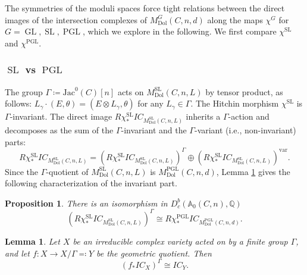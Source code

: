 \documentclass[11pt,reqno]{amsart}
\theoremstyle{plain} %
\newtheorem{prop}[theorem]{Proposition}
\newtheorem{lemma}[theorem]{Lemma}
\theoremstyle{definition}
\newcommand{\QQ}{\mathbb{Q}}
\DeclareMathOperator{\GL}{GL}
\DeclareMathOperator{\SL}{SL}
\DeclareMathOperator{\PGL}{PGL}
\newcommand{\Dol}{\mathrm{Dol}}
\newcommand{\Jac}{\mathrm{Jac}}
\newcommand{\IC}{IC}
\renewcommand{\AA}{\mathbb{A}}
\begin{document}
The symmetries of the moduli spaces force tight relations between the direct images of the intersection complexes of $M^{G}_{\Dol}(C,n,d)$ along the maps $\chi^G$ for $G = \GL, \SL, \PGL$, which we explore in the following. We first compare $\chi^{\SL}$ and $\chi^{\PGL}$.

\subsubsection{$\SL$ vs $\PGL$}  %

The group $\Gamma \coloneqq \Jac^0(C)[n]$ acts on $M^{\SL}_{\Dol}(C,n,L)$ by tensor product, as follows: $L_{\gamma} \cdot (E, \theta)=(E \otimes L_\gamma, \theta)$ for any $L_{\gamma} \in \Gamma$. The Hitchin morphism $\chi^{\SL}$ is $\Gamma$-invariant. The direct image $R\chi_*^{\SL} \IC_{M^{\SL}_{\Dol}(C,n,L)}$ inherits a $\Gamma$-action and decomposes as the sum of the $\Gamma$-invariant and the $\Gamma$-variant (i.e., non-invariant)
parts: 
\begin{equation}\label{eq:SLsplit}
R\chi^{\SL}_* \IC_{M^{\SL}_{\Dol}(C,n,L)}= (R\chi^{\SL}_* \IC_{M^{\SL}_{\Dol}(C,n,L)})^\Gamma \oplus (R\chi^{\SL}_* \IC_{M^{\SL}_{\Dol}(C,n,L)})^{\mathrm{var}}.
\end{equation}
Since the $\Gamma$-quotient of $M^{\SL}_{\Dol}(C,n,L)$ is $M^{\PGL}_{\Dol}(C,n,d)$, Lemma \ref{lemma: IC finite quotient}
gives the following characterization of the invariant part. 
\begin{prop} \label{prop: SL fixed to PGL} There is an isomorphism in $D^{b}_c(\AA_0(C,n), \QQ)$
    $$(R\chi_*^{\SL} \IC_{M^{\SL}_{\Dol}(C,n,L)})^\Gamma \cong R\chi_*^{\PGL} \IC_{M^{\PGL}_{\Dol}(C,n,d)}.$$
\end{prop}

\begin{lemma} \label{lemma: IC finite quotient}
    Let $X$ be an irreducible complex variety acted on by a finite group $\Gamma$, and let $f\colon X \to X/\Gamma \eqqcolon Y$ be the geometric quotient. Then \[(f_* \IC_X)^\Gamma \cong \IC_Y.\]
\end{lemma}
\end{document}
